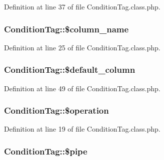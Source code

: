 Definition at line 37 of file Condition\-Tag.\-class.\-php.

\hypertarget{classConditionTag_a75d63b235f269dd4c12b3893fd456c10}{
\subsubsection[{\$column\-\_\-name}]{\setlength{\rightskip}{0pt plus 5cm}Condition\-Tag\-::\$column\-\_\-name}}\label{classConditionTag_a75d63b235f269dd4c12b3893fd456c10}


Definition at line 25 of file Condition\-Tag.\-class.\-php.

\hypertarget{classConditionTag_ac401b3684262dd2a0ff53ff9a97864fe}{
\subsubsection[{\$default\-\_\-column}]{\setlength{\rightskip}{0pt plus 5cm}Condition\-Tag\-::\$default\-\_\-column}}\label{classConditionTag_ac401b3684262dd2a0ff53ff9a97864fe}


Definition at line 49 of file Condition\-Tag.\-class.\-php.

\hypertarget{classConditionTag_a0f8be8743e1e43b334ee1b46d25fd02e}{
\subsubsection[{\$operation}]{\setlength{\rightskip}{0pt plus 5cm}Condition\-Tag\-::\$operation}}\label{classConditionTag_a0f8be8743e1e43b334ee1b46d25fd02e}


Definition at line 19 of file Condition\-Tag.\-class.\-php.

\hypertarget{classConditionTag_a52a8251ff965af25e284262fab02f7f5}{
\subsubsection[{\$pipe}]{\setlength{\rightskip}{0pt plus 5cm}Condition\-Tag\-::\$pipe}}\label{classConditionTag_a52a8251ff965af25e284262fab02f7f5}



